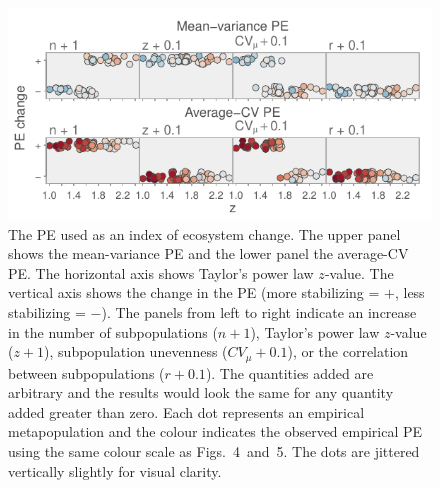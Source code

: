 \begin{figure}[htbp]
  \centering
  \includegraphics[width=5in]{prophets/PE-as-index.pdf}
  \caption{ The PE used as an index of ecosystem change.  The upper panel
    shows the mean-variance PE and the lower panel the average-CV PE.  The
    horizontal axis shows Taylor's power law $z$-value.  The vertical axis
    shows the change in the PE (more stabilizing = $+$, less stabilizing =
    $-$).  The panels from left to right indicate an increase in the number of
    subpopulations ($n + 1$), Taylor's power law $z$-value ($z + 1$),
    subpopulation unevenness ($CV_{\mu} + 0.1$), or the correlation between
    subpopulations ($r + 0.1$). The quantities added are arbitrary and the
    results would look the same for any quantity added greater than zero.  Each
    dot represents an empirical metapopulation and the colour indicates the
    observed empirical PE using the same colour scale as Figs.~4~and~5. The dots
    are jittered vertically slightly for visual clarity.  }
  \label{fig:PE-as-an-index}
\end{figure}


%

